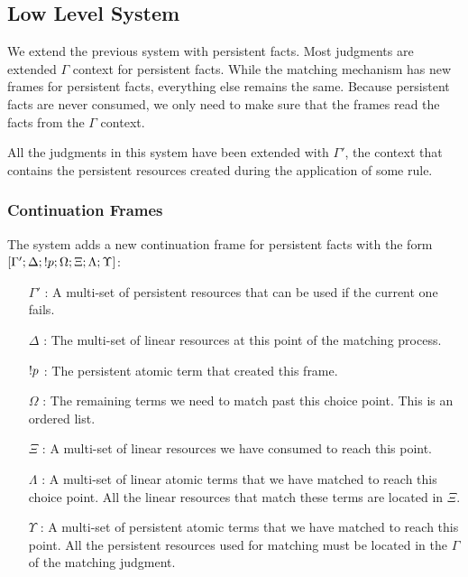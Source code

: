 

\newcommand{\strans}[0]{\m{strans} \;}

\subsection{Low Level System}

We extend the previous system with persistent facts. Most judgments are extended $\Gamma$ context for persistent facts. While the matching mechanism has new frames for persistent facts, everything else remains the same. Because persistent facts are never consumed, we only need to make sure that the frames read the facts from the $\Gamma$ context.

All the judgments in this system have been extended with $\Gamma'$, the context that contains the persistent resources created during the application of some rule.

\subsubsection{Continuation Frames}

The system adds a new continuation frame for persistent facts with the form $[\Gamma'; \Delta; {!} p; \Omega; \Xi; \Lambda; \Upsilon]$:

\begin{enumerate}
   \item[$\Gamma'$]: A multi-set of persistent resources that can be used if the current one fails.
   \item[$\Delta$]: The multi-set of linear resources at this point of the matching process.
   \item[${!} p$]: The persistent atomic term that created this frame.
   \item[$\Omega$]: The remaining terms we need to match past this choice point. This is an ordered list.
   \item[$\Xi$]: A multi-set of linear resources we have consumed to reach this point.
   \item[$\Lambda$]: A multi-set of linear atomic terms that we have matched to reach this choice point. All the linear resources that match these terms are located in $\Xi$.
   \item[$\Upsilon$]: A multi-set of persistent atomic terms that we have matched to reach this point. All the persistent resources used for matching must be located in the $\Gamma$ of the matching judgment.
\end{enumerate}

